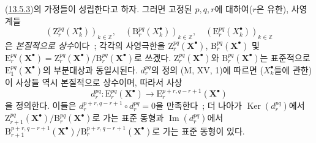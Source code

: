 \begin{env}[13.5.4]
\label{0.13.5.4-fr}
(\hyperref[0.13.5.3-fr]{13.5.3})의 가정들이 성립한다고 하자. 그러면
고정된 $p,q,r$에 대하여($r$은 유한), 사영계들
\[
(\mathrm Z_r^{pq}(X_k^\bullet))_{k\in\mathbb Z},\quad
(\mathrm B_r^{pq}(X_k^\bullet))_{k\in\mathbb Z},\quad
(\mathrm E_r^{pq}(X_k^\bullet))_{k\in\mathbb Z}
\]
은 \emph{본질적으로 상수}이다~; 각각의 사영극한을
$\mathrm Z_r^{pq}(\mathbf X^\bullet)$,
$\mathrm B_r^{pq}(\mathbf X^\bullet)$ 및
$\mathrm E_r^{pq}(\mathbf X^\bullet)=
\mathrm Z_r^{pq}(\mathbf X^\bullet)/
\mathrm B_r^{pq}(\mathbf X^\bullet)$로 쓰겠다.
$\mathrm Z_r^{pq}(\mathbf X^\bullet)$와
$\mathrm B_r^{pq}(\mathbf X^\bullet)$는 표준적으로
$\mathrm E_1^{pq}(\mathbf X^\bullet)$의 부분대상과 동일시된다.
$d_r^{pq}$의 정의 (M, XV, 1)에 따르면 ($X_k^\bullet$들에 관한) 이
사상들 역시 본질적으로 상수이며, 따라서 사상
\begin{equation}
\label{0.13.5.4.1-fr}
\tag{13.5.4.1}
d_r^{pq}:\mathrm E_r^{pq}(\mathbf X^\bullet)
\longrightarrow\mathrm E_r^{p+r,q-r+1}(\mathbf X^\bullet)
\end{equation}
을 정의한다. 이들은 $d_r^{p+r,q-r+1}\circ d_r^{pq}=0$을 만족한다~;
더 나아가 $\operatorname{Ker}(d_r^{pq})$에서
$\mathrm Z_{r+1}^{pq}(\mathbf X^\bullet)/
\mathrm B_r^{pq}(\mathbf X^\bullet)$로 가는 표준 동형과
$\operatorname{Im}(d_r^{pq})$에서
$\mathrm B_{r+1}^{p+r,q-r+1}(\mathbf X^\bullet)/
\mathrm B_r^{p+r,q-r+1}(\mathbf X^\bullet)$로 가는 표준 동형이 있다.
\end{env}

